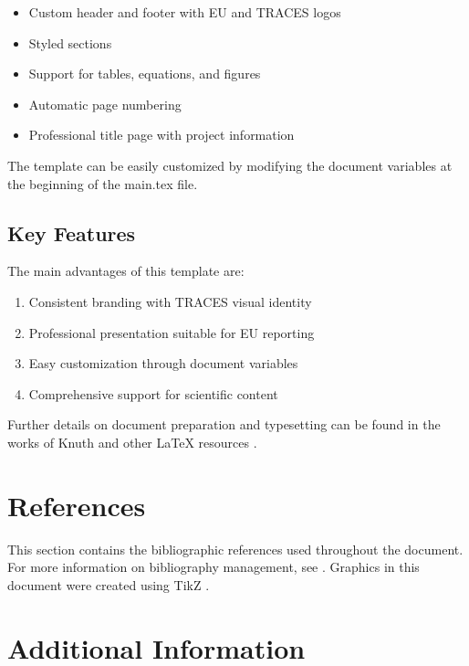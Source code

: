 \documentclass[10pt]{tracesdoc}
\begin{document}
\begin{itemize}
    \item Custom header and footer with EU and TRACES logos
    \item Styled sections
    \item Support for tables, equations, and figures
    \item Automatic page numbering
    \item Professional title page with project information
\end{itemize}

The template can be easily customized by modifying the document variables at the beginning of the main.tex file.

\subsection{Key Features}

The main advantages of this template are:

\begin{enumerate}
    \item Consistent branding with TRACES visual identity
    \item Professional presentation suitable for EU reporting
    \item Easy customization through document variables
    \item Comprehensive support for scientific content
\end{enumerate}

Further details on document preparation and typesetting can be found in the works of Knuth \cite{knuth74,knuth92} and other LaTeX resources \cite{kottwitz2015latex}.

\section{References}

This section contains the bibliographic references used throughout the document. For more information on bibliography management, see \citet{bibtex}. Graphics in this document were created using TikZ \cite{tikz}.



\appendix

\section{Additional Information}
\end{document}

